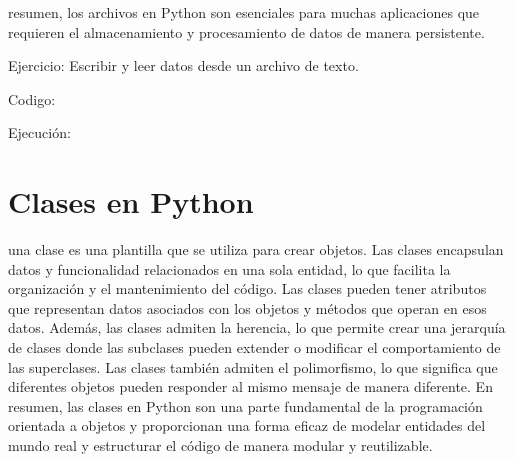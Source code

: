 \documentclass[a4paper]{article}
\begin{document}
\clearpage
\pagestyle{Convertedv}
{
resumen, los archivos en Python son esenciales para muchas aplicaciones que requieren el almacenamiento y procesamiento
de datos de manera persistente.}

{
Ejercicio: Escribir y leer datos desde un archivo de texto.}

\begin{center}
\end{center}
{
Codigo:}

{
Ejecución:}

\begin{center}
\end{center}
\begin{center}
\end{center}

\bigskip


\bigskip


\bigskip

\section{Clases en Python}

\bigskip

{
una clase es una plantilla que se utiliza para crear objetos. Las clases encapsulan datos y funcionalidad relacionados
en una sola entidad, lo que facilita la organización y el mantenimiento del código. Las clases pueden tener atributos
que representan datos asociados con los objetos y métodos que operan en esos datos. Además, las clases admiten la
herencia, lo que permite crear una jerarquía de clases donde las subclases pueden extender o modificar el
comportamiento de las superclases. Las clases también admiten el polimorfismo, lo que significa que diferentes objetos
pueden responder al mismo mensaje de manera diferente. En resumen, las clases en Python son una parte fundamental de la
programación orientada a objetos y proporcionan una forma eficaz de modelar entidades del mundo real y estructurar el
código de manera modular y reutilizable.}
\end{document}
